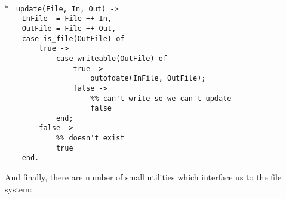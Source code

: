\begin{flushleft}
\label{utilities_7_8}
\\*
\tt
\noindent{}%
\verb&update(File, In, Out) ->&\\
\noindent{}%
\verb&    InFile  = File ++ In,&\\
\noindent{}%
\verb&    OutFile = File ++ Out,&\\
\noindent{}%
\verb&    case is_file(OutFile) of&\\
\noindent{}%
\verb&        true ->&\\
\noindent{}%
\verb&            case writeable(OutFile) of&\\
\noindent{}%
\verb&                true ->&\\
\noindent{}%
\verb&                    outofdate(InFile, OutFile);&\\
\noindent{}%
\verb&                false ->&\\
\noindent{}%
\verb&                    %% can't write so we can't update&\\
\noindent{}%
\verb&                    false&\\
\noindent{}%
\verb&            end;&\\
\noindent{}%
\verb&        false ->&\\
\noindent{}%
\verb&            %% doesn't exist&\\
\noindent{}%
\verb&            true&\\
\noindent{}%
\verb&    end.&\\
\end{flushleft}

  And finally, there are number of  small utilities which interface us
to the file system:

